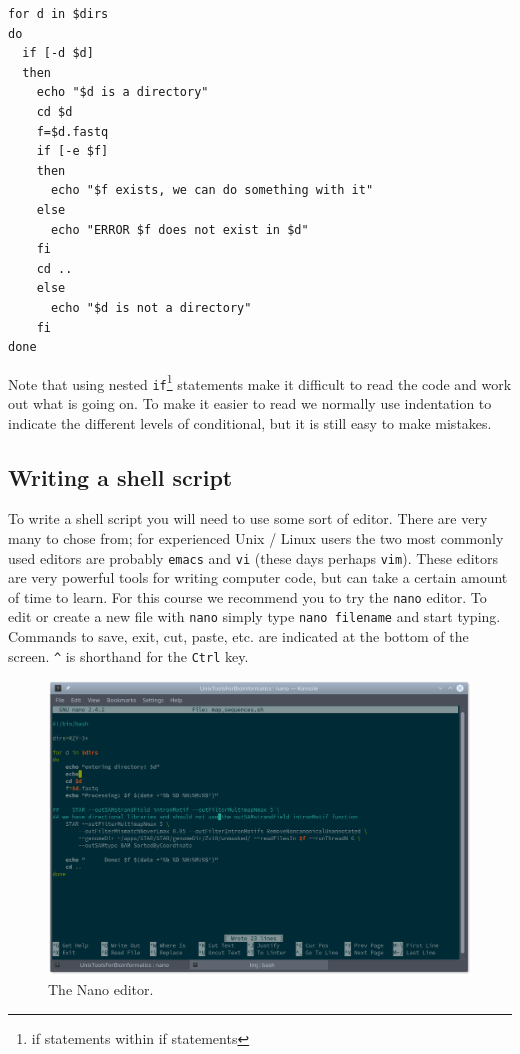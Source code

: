 \documentclass[11pt]{article}
\begin{document}
\begin{verbatim}
for d in $dirs
do
  if [-d $d]
  then
    echo "$d is a directory"
    cd $d
    f=$d.fastq
    if [-e $f]
    then
      echo "$f exists, we can do something with it"
    else
      echo "ERROR $f does not exist in $d"
    fi
    cd ..
    else
      echo "$d is not a directory"
    fi
done
\end{verbatim}

Note that using nested \texttt{if}\footnote{if statements within if statements} statements
make it difficult to read the code and work out what is going on. To make it
easier to read we normally use indentation to indicate the different levels
of conditional, but it is still easy to make mistakes.

\subsection{Writing a shell script}
\label{sec:orgheadline18}
To write a shell script you will need to use some sort of editor. There are
very many to chose from; for experienced Unix / Linux users the two most
commonly used editors are probably \texttt{emacs} and \texttt{vi} (these days perhaps
\texttt{vim}). These editors are very powerful tools for writing computer code, but
can take a certain amount of time to learn. For this course we recommend you
to try the \texttt{nano} editor. To edit or create a new file with \texttt{nano} simply
type \texttt{nano filename} and start typing. Commands to save, exit, cut, paste,
etc. are indicated at the bottom of the screen. \texttt{\textasciicircum{}} is shorthand for the
\texttt{Ctrl} key.

\begin{figure}[htb]
\centering
\includegraphics[width=.9\linewidth]{nanoShell.png}
\caption{\label{fig:orgparagraph3}
The Nano editor.}
\end{figure}
\end{document}
